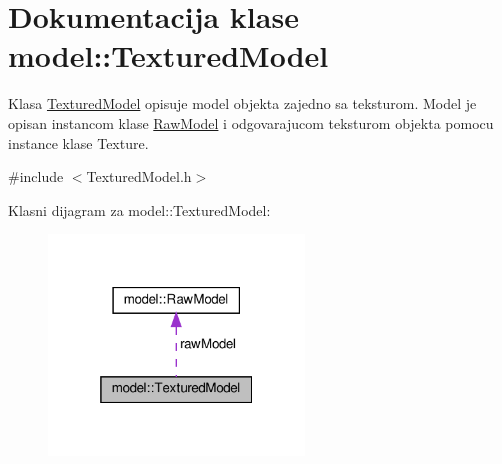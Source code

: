 \hypertarget{classmodel_1_1TexturedModel}{}\section{Dokumentacija klase model\+:\+:Textured\+Model}
\label{classmodel_1_1TexturedModel}


Klasa \hyperlink{classmodel_1_1TexturedModel}{Textured\+Model} opisuje model objekta zajedno sa teksturom. Model je opisan instancom klase \hyperlink{classmodel_1_1RawModel}{Raw\+Model} i odgovarajucom teksturom objekta pomocu instance klase Texture.  




{\ttfamily \#include $<$Textured\+Model.\+h$>$}



Klasni dijagram za model\+:\+:Textured\+Model\+:
\nopagebreak
\begin{figure}[H]
\begin{center}
\leavevmode
\includegraphics[width=193pt]{classmodel_1_1TexturedModel__coll__graph}
\end{center}
\end{figure}
